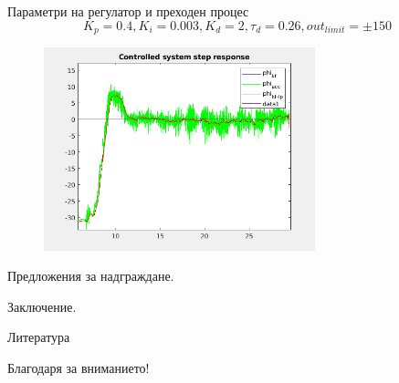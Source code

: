 \documentclass{beamer}
\begin{document}
\begin{frame}{Параметри на регулатор и преходен процес}
	\pause
	\begin{equation*}
		K_p=0.4, K_i=0.003, K_d=2, \tau_d=0.26, out_{limit}=\pm150
	\end{equation*}
	\pause
	\begin{figure}[htpb!]
		\centering
		\includegraphics[width=0.7\textwidth]{Images/controlled_system.png}
	\end{figure}
\end{frame}






\begin{frame}[focus]
	Предложения за надграждане.
\end{frame}

\begin{frame}[focus]
	Заключение.
\end{frame}

\begin{frame}{Литература}
	\nocite{*} %
	
	
\end{frame}


\begin{frame}[focus]
	Благодаря за вниманието!
\end{frame}


\end{document}
